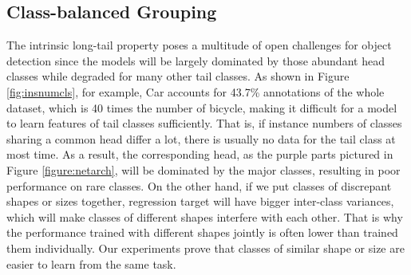 \documentclass[10pt,twocolumn,letterpaper]{article}
\begin{document}
\subsection{Class-balanced Grouping}
The intrinsic long-tail property poses a multitude of open challenges for object detection since the models will be largely dominated by those abundant head classes while degraded for many other tail classes. As shown in Figure \ref{fig:insnumcls}, for example, Car accounts for 43.7\% annotations of the whole dataset, which is 40 times the number of bicycle, making it difficult for a model to learn features of tail classes sufficiently. That is, if instance numbers of classes sharing a common head differ a lot, there is usually no data for the tail class at most time. As a result, the corresponding head, as the purple parts pictured in Figure \ref{figure:netarch}, will be dominated by the major classes, resulting in poor performance on rare classes. On the other hand, if we put classes of discrepant shapes or sizes together, regression target will have bigger inter-class variances, which will make classes of different shapes interfere with each other. That is why the performance trained with different shapes jointly is often lower than trained them individually. Our experiments prove that classes of similar shape or size are easier to learn from the same task.
\end{document}
